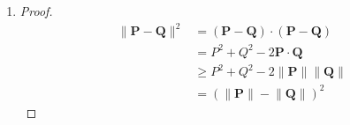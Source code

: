 \documentclass[a4paper]{article}
\newcommand{\vect}{\mathbf}
\begin{document}
\begin{enumerate}
\begin{proof}
\begin{align*}
				&= \vect{P}_z \vect{Q}_x \vect{R}_z - \vect{P}_x \vect{Q}_z \vect{R}_z - \vect{P}_x \vect{Q}_y \vect{R}_y + \vect{P}_y \vect{Q}_x \vect{R}_y,
			\end{align*}
			The $y$ and $z$ components can be checked in a similar manner.
		\end{proof}
	\item
		\begin{proof}
			\begin{align*}
				\lVert \vect{P} - \vect{Q} \rVert^2
				&= (\vect{P} - \vect{Q}) \cdot (\vect{P} - \vect{Q})\\
				&= P^2 + Q^2 - 2 \vect{P} \cdot \vect{Q}\\
				&\geq P^2 + Q^2 - 2 \lVert \vect{P} \rVert \lVert \vect{Q} \rVert\\
				&= (\lVert \vect{P} \rVert - \lVert \vect{Q} \rVert)^2
			\end{align*}
		\end{proof}
\end{enumerate}
\end{document}
